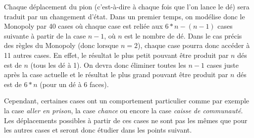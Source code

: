 \documentclass[letterpaper]{article}
\newcommand{\colornode}[1][]{\node[state,
	    align=center,
	    text=gray!40!black,
	    draw=gray,
	    fill=gray!20!white,{#1}]}
\newcommand{\drawedge}{\draw[every loop, line width=0.4mm, fill=gray, draw=gray]}
\begin{document}
    Chaque déplacement du pion (c'est-à-dire à chaque fois que l'on lance le dé) sera 
    traduit par un changement d'état.
    Dans un premier temps, on modélise donc le Monopoly par 40 cases où chaque case est
    reliée aux $6*n-(n-1)$ cases suivante à partir de la case $n-1$, où $n$ est le 
    nombre de dé.  Dans le cas précis des règles du Monopoly (donc lorsque $n = 2$), 
    chaque case pourra donc accéder à 11 autres cases.  En effet, le résultat le plus 
    petit pouvant être produit par $n$ dés est de $n$ (tous les dé à 1).
    On devra donc éliminer toutes les $n-1$ cases juste après la case actuelle et le résultat
    le plus grand pouvant être produit par $n$ dés est de $6*n$ (pour un dé à 6 faces).
    \begin{center}
    \end{center}
    Cependant, certaines cases ont un comportement particulier comme par exemple la 
    case \textit{aller en prison}, la case \textit{chance} ou encore la case
    \textit{caisse de communauté}.  Les déplacements possibles à partir de ces cases
    ne sont pas les mêmes que pour les autres cases et seront donc étudier dans les 
    points suivant.
    
\end{document}
